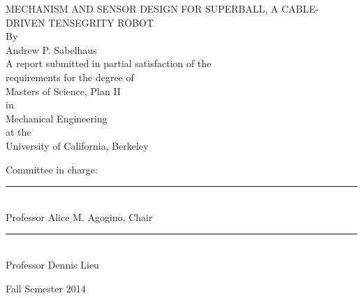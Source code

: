 \documentclass[12pt]{report}
\begin{document}
\begin{titlepage}
\begin{center}
\vspace{6cm}
{\large \uppercase{Mechanism and Sensor Design for SUPERball, a Cable-Driven Tensegrity Robot} \\[1.0cm]}
{By \\[0.5cm] \large Andrew P. Sabelhaus \\[1.5cm]}
{A report submitted in partial satisfaction of the \\[0.4cm]
requirements for the degree of \\[0.4cm]
Masters of Science, Plan II \\[0.4cm]
in \\[0.4cm]
Mechanical Engineering \\[0.4cm]
at the \\[0.4cm]
University of California, Berkeley \\[1.5cm]}
{Committee in charge: \\[1.5cm]
\rule{10cm}{0.4pt} \\
Professor Alice M. Agogino, Chair \\[1.5cm]
\rule{10cm}{0.4pt}\\
Professor Dennis Lieu}
\vfill
{\large Fall Semester 2014}
\end{center}
\end{titlepage}
\end{document}
